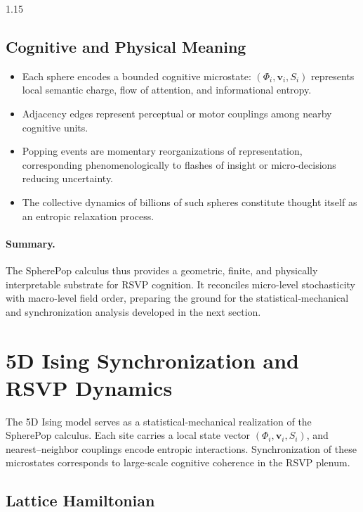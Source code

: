 \documentclass[12pt,a4paper]{article}
\begin{document}
\begin{spacing}{1.15}
\subsection{Cognitive and Physical Meaning}

\begin{itemize}[leftmargin=1.2em]
\item Each sphere encodes a bounded cognitive microstate:
      $(\Phi_i,\mathbf{v}_i,S_i)$ represents local semantic charge,
      flow of attention, and informational entropy.
\item Adjacency edges represent perceptual or motor couplings
      among nearby cognitive units.
\item Popping events are momentary reorganizations of representation,
      corresponding phenomenologically to flashes of insight or
      micro-decisions reducing uncertainty.
\item The collective dynamics of billions of such spheres
      constitute thought itself as an entropic relaxation process.
\end{itemize}

\paragraph{Summary.}
The SpherePop calculus thus provides a geometric,
finite, and physically interpretable substrate for RSVP cognition.
It reconciles micro-level stochasticity with macro-level field order,
preparing the ground for the statistical‐mechanical
and synchronization analysis developed in the next section.

\section{5D Ising Synchronization and RSVP Dynamics}
\label{sec:ising}

The 5D Ising model serves as a statistical‐mechanical realization of
the SpherePop calculus.
Each site carries a local state vector $(\Phi_i,\mathbf{v}_i,S_i)$,
and nearest–neighbor couplings encode entropic interactions.
Synchronization of these microstates corresponds to large‐scale
cognitive coherence in the RSVP plenum.

\subsection{Lattice Hamiltonian}


\end{spacing}
\end{document}
